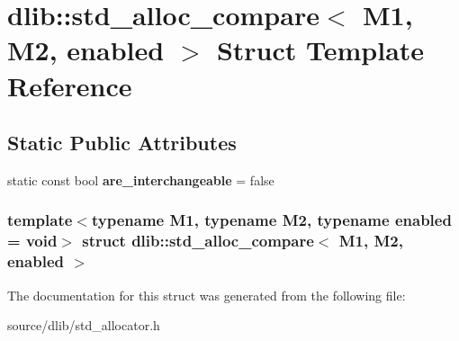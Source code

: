 \hypertarget{structdlib_1_1std__alloc__compare}{
\section{dlib::std\_\-alloc\_\-compare$<$ M1, M2, enabled $>$ Struct Template Reference}
\label{structdlib_1_1std__alloc__compare}
}
\subsection*{Static Public Attributes}
\begin{DoxyCompactItemize}
\item 
\hypertarget{structdlib_1_1std__alloc__compare_ad2777c57afe1b1f76238bf8e8c5916fa}{
static const bool {\bfseries are\_\-interchangeable} = false}
\label{structdlib_1_1std__alloc__compare_ad2777c57afe1b1f76238bf8e8c5916fa}

\end{DoxyCompactItemize}
\subsubsection*{template$<$typename M1, typename M2, typename enabled = void$>$ struct dlib::std\_\-alloc\_\-compare$<$ M1, M2, enabled $>$}



The documentation for this struct was generated from the following file:\begin{DoxyCompactItemize}
\item 
source/dlib/std\_\-allocator.h\end{DoxyCompactItemize}
